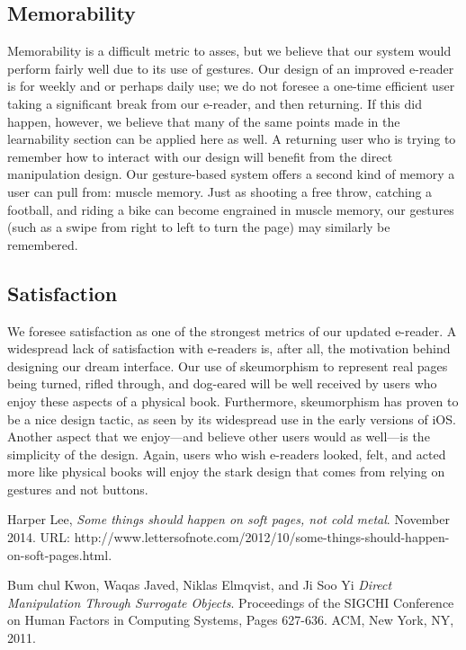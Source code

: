 \documentclass[11pt, oneside]{article}   	%
\begin{document}
\subsection {Memorability}
Memorability is a difficult metric to asses, but we believe that our system would perform fairly well due to its use of gestures. Our design of an improved e-reader is for weekly and or perhaps daily use; we do not foresee a one-time efficient user taking a significant break from our e-reader, and then returning. If this did happen, however, we believe that many of the same points made in the learnability section can be applied here as well. A returning user who is trying to remember how to interact with our design will benefit from the direct manipulation design. Our gesture-based system offers a second kind of memory a user can pull from: muscle memory. Just as shooting a free throw, catching a football, and riding a bike can become engrained in muscle memory, our gestures (such as a swipe from right to left to turn the page) may similarly be remembered.

\subsection {Satisfaction}
We foresee satisfaction as one of the strongest metrics of our updated e-reader. A widespread lack of satisfaction with e-readers is, after all, the motivation behind designing our dream interface. Our use of skeumorphism to represent real pages being turned, rifled through, and dog-eared will be well received by users who enjoy these aspects of a physical book. Furthermore, skeumorphism has proven to be a nice design tactic, as seen by its widespread use in the early versions of iOS. Another aspect that we enjoy---and believe other users would as well---is the simplicity of the design. Again, users who wish e-readers looked, felt, and acted more like physical books will enjoy the stark design that comes from relying on gestures and not buttons.

\begin{thebibliography}{9}

  Harper Lee,
  \emph{Some things should happen on soft pages, not cold metal}.
  November 2014.
  URL: http://www.lettersofnote.com/2012/10/some-things-should-happen-on-soft-pages.html.
  
  Bum chul Kwon, Waqas Javed, Niklas Elmqvist, and Ji Soo Yi
  \emph{Direct Manipulation Through Surrogate Objects}.
  Proceedings of the SIGCHI Conference on Human Factors in Computing Systems,
  Pages 627-636.
  ACM, New York, NY,
  2011.

\end{thebibliography}
\end{document}
